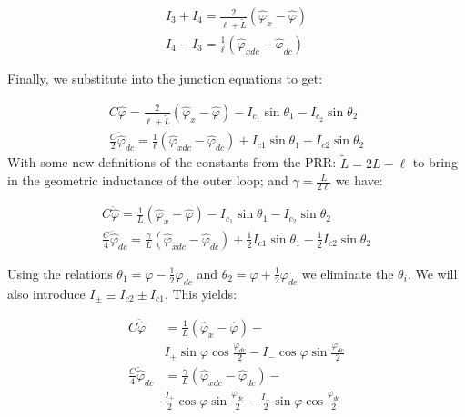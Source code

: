 \documentclass[paper=a4, twocolumn, fontsize=10pt]{article} %
\numberwithin{equation}{section} %
\numberwithin{figure}{section} %
\numberwithin{table}{section} %
\def \df#1{\hat{#1}}
\def \dl#1{#1}
\begin{document}
\begin{align}
    I_3 + I_4 = \frac{2}{\ell+\tilde{L}}\left(\df\varphi_x - \df\varphi \right)
    \\
    I_4 - I_3 =\frac{1}{\ell}\left(\df\varphi_{xdc} - \df\varphi_{dc} \right)
    \end{align}

Finally, we substitute into the junction equations to get:


\begin{align}
    C \ddot{\df\varphi} = \frac{2}{\ell+\tilde{L}}\left( \df\varphi_x - \df\varphi \right) - I_{c_1} \sin \dl\theta_1 - I_{c_2} \sin \dl\theta_2
    \\
    \frac{C}{2} \ddot{\df\varphi}_{dc}= \frac{1}{\ell}\left( \df\varphi_{xdc} -\df\varphi_{dc}\right) +I_{c1} \sin\dl\theta_1 - I_{c2} \sin \dl\theta_2
    \end{align}
With some new definitions of the constants from the PRR: $\tilde{L} = 2L-\ell$ to bring in the geometric inductance of the outer loop; and $\gamma = \frac{L}{2\ell}$ we have:

\begin{align}
    C \ddot{\df\varphi} = \frac{1}{L}\left( \df\varphi_x - \df\varphi \right) - I_{c_1} \sin \dl\theta_1 - I_{c_2} \sin \dl\theta_2
    \\
    \frac{C}{4} \ddot{\df\varphi}_{dc}= \frac{\gamma}{L}\left( \df\varphi_{xdc} -\df\varphi_{dc}\right) +\frac{1}{2}I_{c1} \sin \dl\theta_1 - \frac{1}{2} I_{c2} \sin \dl\theta_2
    \end{align}


Using the relations $\dl\theta_1 = \dl\varphi - \frac{1}{2}\dl\varphi_{dc} $ and $\dl\theta_2 = \dl\varphi + \frac{1}{2}\dl\varphi_{dc} $ we eliminate the $\dl\theta_i$. We will also introduce $I_{\pm} \equiv I_{c2} \pm I_{c1}$.  This yields:

\begin{align}
    C \ddot{\df\varphi} &= \frac{1}{L}\left( \df\varphi_x - \df\varphi \right) - 
    \\
    &I_{+} \sin \dl\varphi \cos \frac{\dl\varphi_{dc}}{2} - I_{-} \cos \dl\varphi \sin \frac{\dl\varphi_{dc}}{2}
    \\
    \frac{C}{4} \ddot{\df\varphi}_{dc} &= \frac{\gamma}{L}\left( \df\varphi_{xdc} -\df\varphi_{dc}\right) - 
    \\
    &\frac{I_{+}}{2} \cos \dl\varphi \sin \frac{\dl\varphi_{dc}}{2} - \frac{I_{-}}{2} \sin \dl\varphi \cos \frac{\dl\varphi_{dc}}{2}
\end{align}
\end{document}
